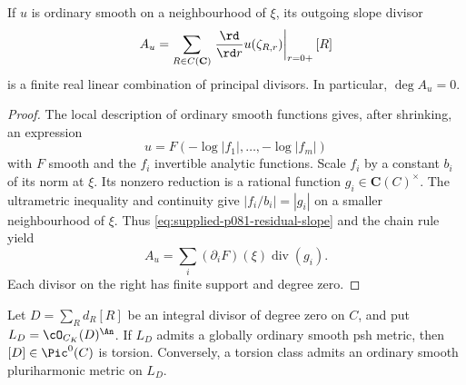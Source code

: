 \begin{lemma}\label{lem:supplied-p081-smooth-slope-divisor}
If $u$ is ordinary smooth on a neighbourhood of $\xi$, its outgoing slope
divisor
\[
 A_u=\sum_{R\in C(\mathbf C)}
       \left.\frac{\rd}{\rd r}u(\zeta_{R,r})\right|_{r=0+}[R]
\]
is a finite real linear combination of principal divisors.  In particular,
$\deg A_u=0$.
\end{lemma}

\begin{proof}
The local description of ordinary smooth functions
\cite[Proposition~15.1.1(b) and Corollary~15.1.2]{CLD25} gives, after
shrinking, an expression
\[
                  u=F(-\log|f_1|,\ldots,-\log|f_m|)
\]
with $F$ smooth and the $f_i$ invertible analytic functions.  Scale $f_i$
by a constant $b_i$ of its norm at $\xi$.  Its nonzero reduction is a
rational function $g_i\in\mathbf C(C)^\times$.  The ultrametric inequality
and continuity give $|f_i/b_i|=|g_i|$ on a smaller neighbourhood of $\xi$.
Thus \eqref{eq:supplied-p081-residual-slope} and the chain rule yield
\[
                   A_u=\sum_i(\partial_iF)(\xi)\operatorname{div}(g_i).
\]
Each divisor on the right has finite support and degree zero.
\end{proof}

\begin{proposition}\label{prop:supplied-p081-torsion-obstruction}
Let $D=\sum_Rd_R[R]$ be an integral divisor of degree zero on $C$, and put
$L_D=\cO_{C_K}(D)^{\An}$.  If $L_D$ admits a globally ordinary smooth psh
metric, then $[D]\in\Pic^0(C)$ is torsion.  Conversely, a torsion class
admits an ordinary smooth pluriharmonic metric on $L_D$.
\end{proposition}

